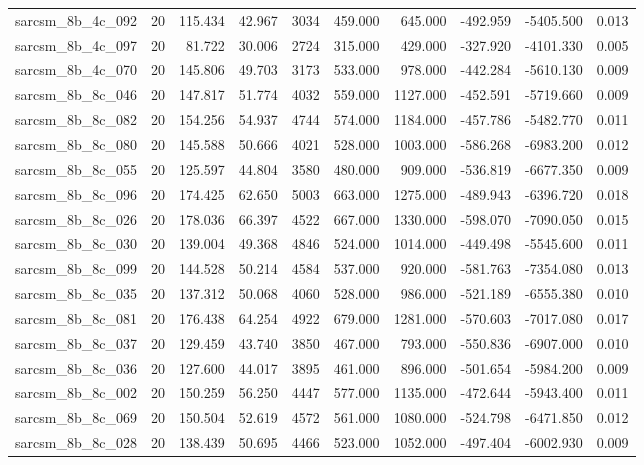 \begin{tabular}{lrrrrrrrrr}
sarcsm\_8b\_4c\_092 & 20 & 115.434 & 42.967 & 3034 & 459.000 & 645.000 & -492.959 & -5405.500 & 0.013 \\
sarcsm\_8b\_4c\_097 & 20 & 81.722 & 30.006 & 2724 & 315.000 & 429.000 & -327.920 & -4101.330 & 0.005 \\
sarcsm\_8b\_4c\_070 & 20 & 145.806 & 49.703 & 3173 & 533.000 & 978.000 & -442.284 & -5610.130 & 0.009 \\
sarcsm\_8b\_8c\_046 & 20 & 147.817 & 51.774 & 4032 & 559.000 & 1127.000 & -452.591 & -5719.660 & 0.009 \\
sarcsm\_8b\_8c\_082 & 20 & 154.256 & 54.937 & 4744 & 574.000 & 1184.000 & -457.786 & -5482.770 & 0.011 \\
sarcsm\_8b\_8c\_080 & 20 & 145.588 & 50.666 & 4021 & 528.000 & 1003.000 & -586.268 & -6983.200 & 0.012 \\
sarcsm\_8b\_8c\_055 & 20 & 125.597 & 44.804 & 3580 & 480.000 & 909.000 & -536.819 & -6677.350 & 0.009 \\
sarcsm\_8b\_8c\_096 & 20 & 174.425 & 62.650 & 5003 & 663.000 & 1275.000 & -489.943 & -6396.720 & 0.018 \\
sarcsm\_8b\_8c\_026 & 20 & 178.036 & 66.397 & 4522 & 667.000 & 1330.000 & -598.070 & -7090.050 & 0.015 \\
sarcsm\_8b\_8c\_030 & 20 & 139.004 & 49.368 & 4846 & 524.000 & 1014.000 & -449.498 & -5545.600 & 0.011 \\
sarcsm\_8b\_8c\_099 & 20 & 144.528 & 50.214 & 4584 & 537.000 & 920.000 & -581.763 & -7354.080 & 0.013 \\
sarcsm\_8b\_8c\_035 & 20 & 137.312 & 50.068 & 4060 & 528.000 & 986.000 & -521.189 & -6555.380 & 0.010 \\
sarcsm\_8b\_8c\_081 & 20 & 176.438 & 64.254 & 4922 & 679.000 & 1281.000 & -570.603 & -7017.080 & 0.017 \\
sarcsm\_8b\_8c\_037 & 20 & 129.459 & 43.740 & 3850 & 467.000 & 793.000 & -550.836 & -6907.000 & 0.010 \\
sarcsm\_8b\_8c\_036 & 20 & 127.600 & 44.017 & 3895 & 461.000 & 896.000 & -501.654 & -5984.200 & 0.009 \\
sarcsm\_8b\_8c\_002 & 20 & 150.259 & 56.250 & 4447 & 577.000 & 1135.000 & -472.644 & -5943.400 & 0.011 \\
sarcsm\_8b\_8c\_069 & 20 & 150.504 & 52.619 & 4572 & 561.000 & 1080.000 & -524.798 & -6471.850 & 0.012 \\
sarcsm\_8b\_8c\_028 & 20 & 138.439 & 50.695 & 4466 & 523.000 & 1052.000 & -497.404 & -6002.930 & 0.009 \\

\end{tabular}
